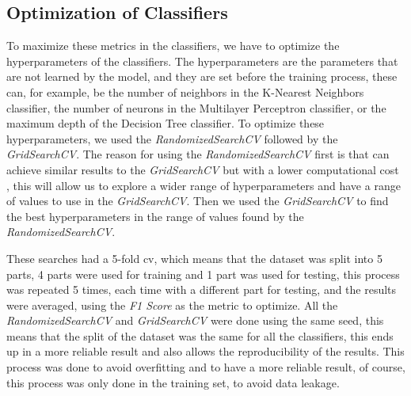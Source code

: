 \subsection{Optimization of Classifiers}

To maximize these metrics in the classifiers, we have to optimize the hyperparameters of the classifiers. The hyperparameters are the parameters that are not learned by the model, and they are set before the training process, these can, for example, be the number of neighbors in the K-Nearest Neighbors classifier, the number of neurons in the Multilayer Perceptron classifier, or the maximum depth of the Decision Tree classifier. To optimize these hyperparameters, we used the \textit{RandomizedSearchCV} followed by the \textit{GridSearchCV}. The reason for using the \textit{RandomizedSearchCV} first is that can achieve similar results to the \textit{GridSearchCV} but with a lower computational cost \cite{bergstra_random_nodate}, this will allow us to explore a wider range of hyperparameters and have a range of values to use in the \textit{GridSearchCV}. Then we used the \textit{GridSearchCV} to find the best hyperparameters in the range of values found by the \textit{RandomizedSearchCV}.


These searches had a 5-fold \ac{cv}, which means that the dataset was split into 5 parts, 4 parts were used for training and 1 part was used for testing, this process was repeated 5 times, each time with a different part for testing, and the results were averaged, using the \textit{F1 Score} as the metric to optimize. All the \textit{RandomizedSearchCV} and \textit{GridSearchCV} were done using the same seed, this means that the split of the dataset was the same for all the classifiers, this ends up in a more reliable result and also allows the reproducibility of the results. This process was done to avoid overfitting and to have a more reliable result, of course, this process was only done in the training set, to avoid data leakage.